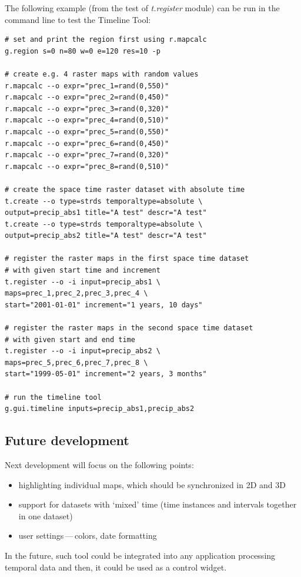 \documentclass[a4paper,12pt,oneside]{book}
\newcommand{\module}[1]{\textsl{#1}}
\newcommand{\dash}{\mbox{\,---\,}}
\begin{document}
The following example (from the test of \module{t.register} module)
can be run in the command line to test the Timeline Tool:
\begin{small}
\begin{lstlisting}[style=mybash]
# set and print the region first using r.mapcalc
g.region s=0 n=80 w=0 e=120 res=10 -p

# create e.g. 4 raster maps with random values
r.mapcalc --o expr="prec_1=rand(0,550)"
r.mapcalc --o expr="prec_2=rand(0,450)"
r.mapcalc --o expr="prec_3=rand(0,320)"
r.mapcalc --o expr="prec_4=rand(0,510)"
r.mapcalc --o expr="prec_5=rand(0,550)"
r.mapcalc --o expr="prec_6=rand(0,450)"
r.mapcalc --o expr="prec_7=rand(0,320)"
r.mapcalc --o expr="prec_8=rand(0,510)"

# create the space time raster dataset with absolute time
t.create --o type=strds temporaltype=absolute \
output=precip_abs1 title="A test" descr="A test"
t.create --o type=strds temporaltype=absolute \
output=precip_abs2 title="A test" descr="A test"

# register the raster maps in the first space time dataset
# with given start time and increment
t.register --o -i input=precip_abs1 \
maps=prec_1,prec_2,prec_3,prec_4 \
start="2001-01-01" increment="1 years, 10 days"

# register the raster maps in the second space time dataset
# with given start and end time
t.register --o -i input=precip_abs2 \
maps=prec_5,prec_6,prec_7,prec_8 \
start="1999-05-01" increment="2 years, 3 months"

# run the timeline tool
g.gui.timeline inputs=precip_abs1,precip_abs2
\end{lstlisting}
\end{small}

\subsection{Future development}
Next development will focus on the following points:
\begin{itemize}
  \item highlighting individual maps, which should be synchronized in 2D and 3D
  \item support for datasets with `mixed' time (time instances and intervals together in one dataset)
  \item user settings\dash colors, date formatting
\end{itemize}
In the future, such tool could be integrated into any application processing temporal data
and then, it could be used as a control widget.
\end{document}
